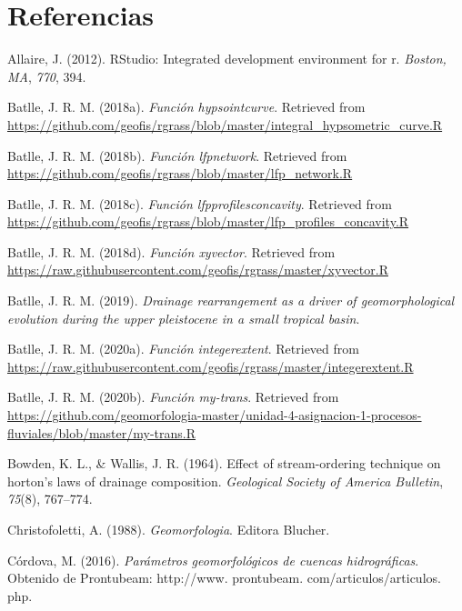 \documentclass[11pt,]{article}
\begin{document}
\section*{Referencias}\label{referencias}

\hypertarget{refs}{}
\hypertarget{ref-allaire2012rstudio}{}
Allaire, J. (2012). RStudio: Integrated development environment for r.
\emph{Boston, MA}, \emph{770}, 394.

\hypertarget{ref-Hypsocjose}{}
Batlle, J. R. M. (2018a). \emph{Función hypsointcurve}. Retrieved from
\url{https://github.com/geofis/rgrass/blob/master/integral_hypsometric_curve.R}

\hypertarget{ref-lfpnetjose}{}
Batlle, J. R. M. (2018b). \emph{Función lfpnetwork}. Retrieved from
\url{https://github.com/geofis/rgrass/blob/master/lfp_network.R}

\hypertarget{ref-lfpconcajose}{}
Batlle, J. R. M. (2018c). \emph{Función lfpprofilesconcavity}. Retrieved
from
\url{https://github.com/geofis/rgrass/blob/master/lfp_profiles_concavity.R}

\hypertarget{ref-xyvector}{}
Batlle, J. R. M. (2018d). \emph{Función xyvector}. Retrieved from
\url{https://raw.githubusercontent.com/geofis/rgrass/master/xyvector.R}

\hypertarget{ref-batlle2019drainage}{}
Batlle, J. R. M. (2019). \emph{Drainage rearrangement as a driver of
geomorphological evolution during the upper pleistocene in a small
tropical basin}.

\hypertarget{ref-intext}{}
Batlle, J. R. M. (2020a). \emph{Función integerextent}. Retrieved from
\url{https://raw.githubusercontent.com/geofis/rgrass/master/integerextent.R}

\hypertarget{ref-Mytransjose}{}
Batlle, J. R. M. (2020b). \emph{Función my-trans}. Retrieved from
\url{https://github.com/geomorfologia-master/unidad-4-asignacion-1-procesos-fluviales/blob/master/my-trans.R}

\hypertarget{ref-bowden1964effect}{}
Bowden, K. L., \& Wallis, J. R. (1964). Effect of stream-ordering
technique on horton's laws of drainage composition. \emph{Geological
Society of America Bulletin}, \emph{75}(8), 767--774.

\hypertarget{ref-christofoletti1988geomorfologia}{}
Christofoletti, A. (1988). \emph{Geomorfologia}. Editora Blucher.

\hypertarget{ref-cordova2016parametros}{}
Córdova, M. (2016). \emph{Parámetros geomorfológicos de cuencas
hidrográficas}. Obtenido de Prontubeam: http://www. prontubeam.
com/articulos/articulos. php.
\end{document}
